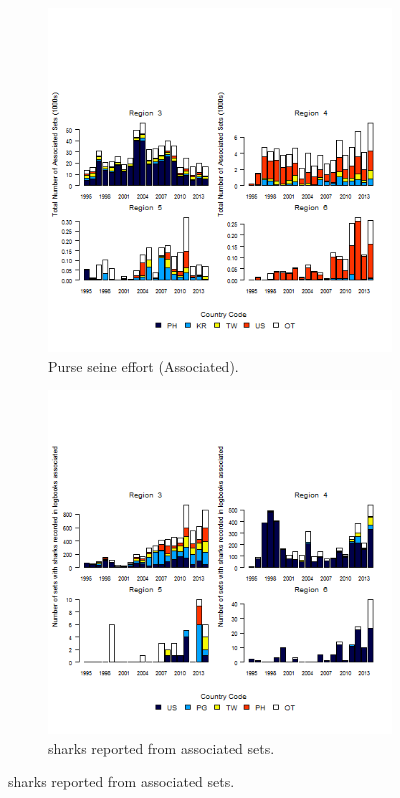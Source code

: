 \documentclass[12pt]{SCreport}
\begin{document}
\begin{landscape}
\begin{figure}
\centering
   \begin{subfigure}[b]{0.49\textwidth}
       \includegraphics[width=\textwidth]{../GRAPHICS/Defined/FIG_08a_ps_total_effAssociated}
       \caption{Purse seine effort (Associated).}
       \label{fig:test1}
   \end{subfigure}
   \begin{subfigure}[b]{0.49\textwidth}
       \includegraphics[width=\textwidth]{../GRAPHICS/Defined/FIG_08b_ps_oper_shks_rep_cntry_associated}
       \caption{sharks reported from associated sets.}
       \label{fig:test2}
   \end{subfigure}


\end{figure}
\end{landscape}
\end{document}
